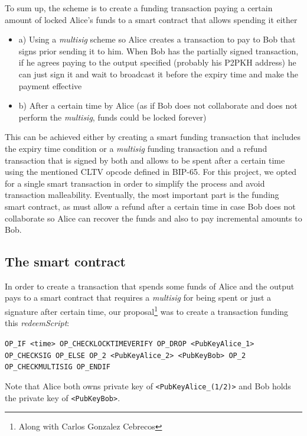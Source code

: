 \documentclass[12pt,journal,compsoc]{IEEEtran}
\newcommand{\code}[1]{\texttt{#1}}
\begin{document}
To sum up, the scheme is to create a funding transaction paying a certain amount of locked Alice's funds to a smart contract that allows spending it either
\begin{itemize}
    \item a) Using a \textit{multisig} scheme so Alice creates a transaction to pay to Bob that signs prior sending it to him. When Bob has the partially signed transaction, if he agrees paying to the output specified (probably his P2PKH address) he can just sign it and wait to broadcast it before the expiry time and make the payment effective
    \item b) After a certain time by Alice (as if Bob does not collaborate and does not perform the \textit{multisig}, funds could be locked forever)
\end{itemize}
This can be achieved either by creating a smart funding transaction that includes the expiry time condition or a \textit{multisig} funding transaction and a refund transaction that is signed by both and allows to be spent after a certain time using the mentioned CLTV opcode defined in BIP-65\cite{bip-65:online}. For this project, we opted for a single smart transaction in order to simplify the process and avoid transaction malleability. Eventually, the most important part is the funding smart contract, as must allow a refund after a certain time in case Bob does not collaborate so Alice can recover the funds and also to pay incremental amounts to Bob.
\subsection{The smart contract}
In order to create a transaction that spends some funds of Alice and the output pays to a smart contract that requires a \textit{multisig} for being spent or just a signature after certain time, our proposal\footnote{Along with Carlos Gonzalez Cebrecos} was to create a transaction funding this \textit{redeemScript}:
\begin{center}
\code{OP\_IF <time> OP\_CHECKLOCKTIMEVERIFY OP\_DROP <PubKeyAlice\_1> OP\_CHECKSIG OP\_ELSE OP\_2 <PubKeyAlice\_2> <PubKeyBob> OP\_2 OP\_CHECKMULTISIG OP\_ENDIF}
\end{center}
Note that Alice both owns private key of \code{<PubKeyAlice\_(1/2)>} and Bob holds the private key of \code{<PubKeyBob>}. 
\end{document}
